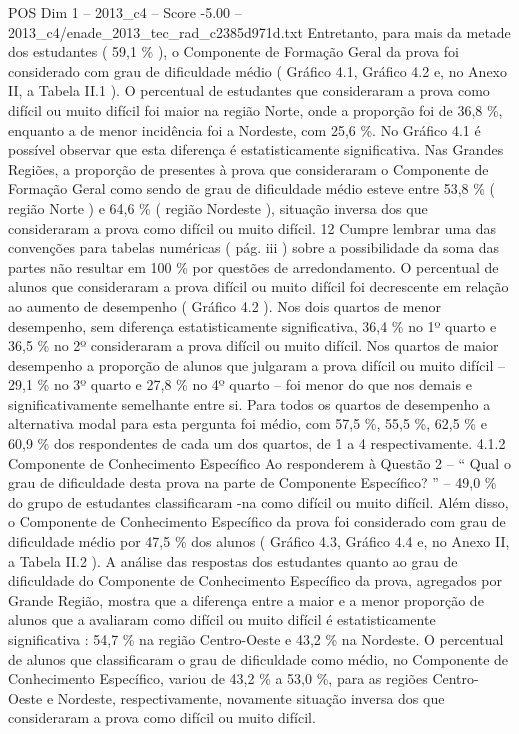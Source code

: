 \begin{textsample}{POS Dim 1 – 2013\_c4 – Score -5.00 – 2013\_c4/enade\_2013\_tec\_rad\_c2385d971d.txt}
Entretanto, para mais da metade dos estudantes ( 59,1 \% ), o Componente de Formação Geral da prova foi considerado com grau de dificuldade médio ( Gráfico 4.1, Gráfico 4.2 e, no Anexo II, a Tabela II.1 ).
O percentual de estudantes que consideraram a prova como difícil ou muito difícil foi maior na região Norte, onde a proporção foi de 36,8 \%, enquanto a de menor incidência foi a Nordeste, com 25,6 \%.
No Gráfico 4.1 é possível observar que esta diferença é estatisticamente significativa.
Nas Grandes Regiões, a proporção de presentes à prova que consideraram o Componente de Formação Geral como sendo de grau de dificuldade médio esteve entre 53,8 \% ( região Norte ) e 64,6 \% ( região Nordeste ), situação inversa dos que consideraram a prova como difícil ou muito difícil. 12 Cumpre lembrar uma das convenções para tabelas numéricas ( pág. iii ) sobre a possibilidade da soma das partes não resultar em 100 \% por questões de arredondamento.
O percentual de alunos que consideraram a prova difícil ou muito difícil foi decrescente em relação ao aumento de desempenho ( Gráfico 4.2 ).
Nos dois quartos de menor desempenho, sem diferença estatisticamente significativa, 36,4 \% no 1º quarto e 36,5 \% no 2º consideraram a prova difícil ou muito difícil.
Nos quartos de maior desempenho a proporção de alunos que julgaram a prova difícil ou muito difícil – 29,1 \% no 3º quarto e 27,8 \% no 4º quarto – foi menor do que nos demais e significativamente semelhante entre si.
Para todos os quartos de desempenho a alternativa modal para esta pergunta foi médio, com 57,5 \%, 55,5 \%, 62,5 \% e 60,9 \% dos respondentes de cada um dos quartos, de 1 a 4 respectivamente. 4.1.2 Componente de Conhecimento Específico Ao responderem à Questão 2 – “ Qual o grau de dificuldade desta prova na parte de Componente Específico? ” – 49,0 \% do grupo de estudantes classificaram -na como difícil ou muito difícil.
Além disso, o Componente de Conhecimento Específico da prova foi considerado com grau de dificuldade médio por 47,5 \% dos alunos ( Gráfico 4.3, Gráfico 4.4 e, no Anexo II, a Tabela II.2 ).
A análise das respostas dos estudantes quanto ao grau de dificuldade do Componente de Conhecimento Específico da prova, agregados por Grande Região, mostra que a diferença entre a maior e a menor proporção de alunos que a avaliaram como difícil ou muito difícil é estatisticamente significativa : 54,7 \% na região Centro-Oeste e 43,2 \% na Nordeste.
O percentual de alunos que classificaram o grau de dificuldade como médio, no Componente de Conhecimento Específico, variou de 43,2 \% a 53,0 \%, para as regiões Centro-Oeste e Nordeste, respectivamente, novamente situação inversa dos que consideraram a prova como difícil ou muito difícil.

\end{textsample}
